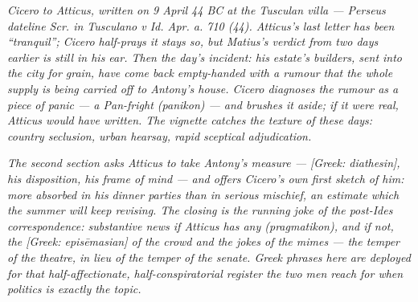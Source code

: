 
\textit{Cicero to Atticus, written on 9 April 44 BC at the
Tusculan villa --- Perseus dateline \textit{Scr. in Tusculano v
Id. Apr. a. 710 (44)}. Atticus's last letter has been
``tranquil''; Cicero half-prays it stays so, but Matius's verdict
from two days earlier is still in his ear. Then the day's
incident: his estate's builders, sent into the city for grain,
have come back empty-handed with a rumour that the whole supply
is being carried off to Antony's house. Cicero diagnoses the
rumour as a piece of panic --- a Pan-fright (\textit{panikon}) ---
and brushes it aside; if it were real, Atticus would have
written. The vignette catches the texture of these days: country
seclusion, urban hearsay, rapid sceptical adjudication.}

\textit{The second section asks Atticus to take Antony's measure
--- \textit{[Greek: diathesin]}, his disposition, his frame of
mind --- and offers Cicero's own first sketch of him: more
absorbed in his dinner parties than in serious mischief, an
estimate which the summer will keep revising. The closing is the
running joke of the post-Ides correspondence: substantive news
if Atticus has any (\textit{pragmatikon}), and if not, the
\textit{[Greek: episēmasian]} of the crowd and the jokes of the
mimes --- the temper of the theatre, in lieu of the temper of
the senate. Greek phrases here are deployed for that
half-affectionate, half-conspiratorial register the two men
reach for when politics is exactly the topic.}
